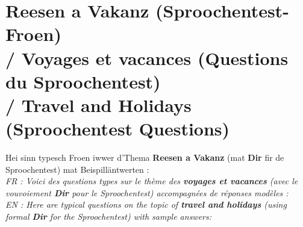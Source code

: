 \vspace{1.5em}

\section[Reesen a Vakanz (Sproochentest-Froen)]{Reesen a Vakanz (Sproochentest-Froen) \\/ Voyages et vacances (Questions du Sproochentest) \\/ Travel and Holidays (Sproochentest Questions)}

Hei sinn typesch Froen iwwer d'Thema \textbf{Reesen a Vakanz} (mat \textbf{Dir} fir de Sproochentest) mat Beispilläntwerten : \\
\textit{FR : Voici des questions types sur le thème des \textbf{voyages et vacances} (avec le vouvoiement \textbf{Dir} pour le Sproochentest) accompagnées de réponses modèles :} \\
\textit{EN : Here are typical questions on the topic of \textbf{travel and holidays} (using formal \textbf{Dir} for the Sproochentest) with sample answers:}

